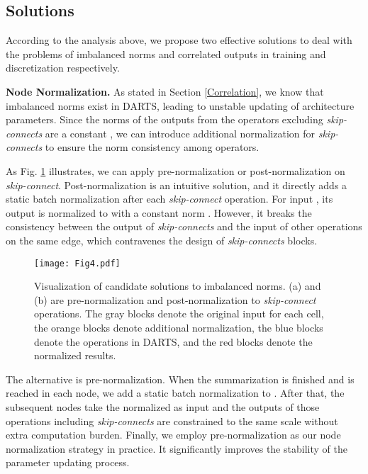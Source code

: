 \documentclass[journal]{IEEEtran}
\begin{document}
\subsection{Solutions}
According to the analysis above, we propose two effective solutions to deal with the problems of imbalanced norms and correlated outputs in training and discretization respectively.

\textbf{Node Normalization.} As stated in Section \ref{Correlation}, we know that imbalanced norms exist in DARTS, leading to unstable updating of architecture parameters. Since the norms of the outputs from the operators excluding \textit{skip-connects} are a constant , we can introduce additional normalization for \textit{skip-connects} to ensure the norm consistency among operators.  

As Fig. \ref{fig:norm} illustrates, we can apply pre-normalization or  post-normalization on \textit{skip-connect}. Post-normalization is an intuitive solution, and it directly adds a static batch normalization after each \textit{skip-connect} operation. For input , its output is normalized to  with a constant norm .  However, it breaks the consistency between the output of \textit{skip-connects} and the input of other operations on the same edge, which contravenes the design of \textit{skip-connects} blocks. 

\begin{figure}[!hbt]
\begin{center}
\end{center}
	\texttt{[image: Fig4.pdf]}
   \caption{Visualization of candidate solutions to imbalanced norms. (a) and (b) are pre-normalization and post-normalization to \textit{skip-connect} operations. The gray blocks denote the original input for each cell, the orange blocks denote additional normalization, the blue blocks denote the operations in DARTS, and the red blocks denote the normalized results.}
\label{fig:norm}
\end{figure} 

The alternative is pre-normalization. When the summarization is finished and  is reached in each node, we add a static batch normalization to . After that, the subsequent nodes take the normalized  as input and the outputs of those operations including \textit{skip-connects} are constrained to the same scale without extra computation burden. Finally, we employ pre-normalization as our node normalization strategy in practice. It significantly improves the stability of the parameter updating process.
\end{document}
